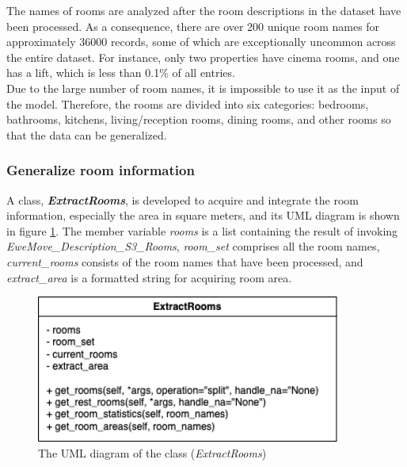 \documentclass[12pt,twoside]{report}
\begin{document}
The names of rooms are analyzed after the room descriptions in the dataset have been processed. As a consequence, there are over 200 unique room names for approximately 36000 records, some of which are exceptionally uncommon across the entire dataset. For instance, only two properties have cinema rooms, and one has a lift, which is less than 0.1\% of all entries.  
\\

Due to the large number of room names, it is impossible to use it as the input of the model. Therefore, the rooms are divided into six categories: bedrooms, bathrooms, kitchens, living/reception rooms, dining rooms, and other rooms so that the data can be generalized. 
\\

\subsubsection{Generalize room information}
A class, \textit{\textbf{ExtractRooms}}, is developed to acquire and integrate the room information, especially the area in square meters, and its UML diagram is shown in figure \ref{uml_extract_rooms}. The member variable \textit{rooms} is a list containing the result of invoking \textit{EweMove\_Description\_S3\_Rooms}, \textit{room\_set} comprises all the room names, \textit{current\_rooms} consists of the room names that have been processed, and \textit{extract\_area} is a formatted string for acquiring room area. 
\\

\begin{figure}[!htbp]
	\centering
	\includegraphics[width=10cm]{uml_extract_rooms}
	\caption{The UML diagram of the class (\textit{ExtractRooms})}
	\label{uml_extract_rooms}
\end{figure}
\end{document}
